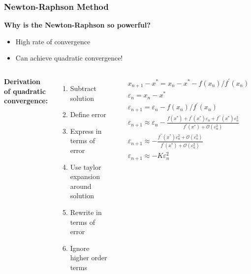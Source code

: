 \begin{frame}[fragile]
    \frametitle{Newton-Raphson Method}
    
    \textbf{Why is the Newton-Raphson so powerful?}
    \begin{itemize}
        \item High rate of convergence
        \item Can achieve quadratic convergence!
    \end{itemize}

    \begin{columns}
      \textbf{Derivation of quadratic convergence:}
      \begin{enumerate}
          \item Subtract solution
          \item Define error
          \item Express in terms of error
          \item Use taylor expansion around solution
          \item Rewrite in terms of error
          \item Ignore higher order terms
        \end{enumerate}
        \begin{align*}
          &x_{n+1} - x^*     = x_n - x^* - f(x_n)/f^\prime(x_n) \\
        &\varepsilon_n    = x_n - x^*  \\
        &\varepsilon_{n+1} = \varepsilon_n - f(x_n)/f^\prime(x_n)  \\
        &\varepsilon_{n+1} \approx \varepsilon_n - \frac{f(x^*)+f^{\prime}(x^*)\varepsilon_n+f^{\prime\prime}(x^*)\varepsilon_n ^2}{f^\prime(x^*)+\mathcal{O}(\varepsilon_n ^2)}\\
        &\varepsilon_{n+1} \approx -\frac{f^{\prime\prime}(x^*)\varepsilon_n ^2 + \mathcal{O}(\varepsilon_n ^3)}{f^\prime(x^*)+\mathcal{O}(\varepsilon_n ^2)}\\
        &\boxed{\varepsilon_{n+1} \approx -K\varepsilon_n ^2}
        \end{align*}
      \end{columns}
\end{frame}

